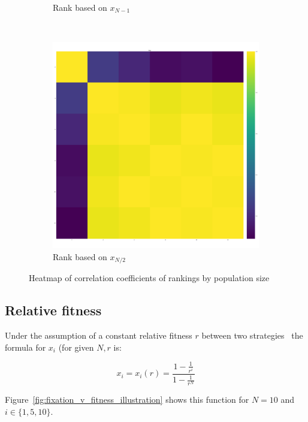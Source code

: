 \documentclass{article}
\begin{document}
\begin{figure}[!htbp]
\begin{subfigure}[t]{.3\textwidth}
        \caption{Rank based on \(x_{N - 1}\)}
    \end{subfigure}
    ~
	\begin{subfigure}[t]{.3\textwidth}
		\centering
		\includegraphics[width=.9\textwidth]{./img/correlation_heatmap_coexist.pdf}
        \caption{Rank based on \(x_{N/2}\)}
    \end{subfigure}
    \caption{Heatmap of correlation coefficients of rankings by population size}
    \label{fig:correlation_coefficients}
\end{figure}

\subsection{Relative fitness}\label{sec:relative_fitness}


Under the assumption of a constant relative fitness \(r\) between two
strategies~\cite{Nowak} the formula for \(x_i\) (for given \(N, r\) is:

\begin{equation}\label{equ:fixation_probability_with_constant_relative_fitness}
    x_i = x_i(r) = \frac{1-\frac{1}{r^{i}}}{1-\frac{1}{r^{N}}}
\end{equation}

Figure~\ref{fig:fixation_v_fitness_illustration} shows this function for
\(N=10\) and \(i\in\{1, 5, 10\}\).
\end{document}
